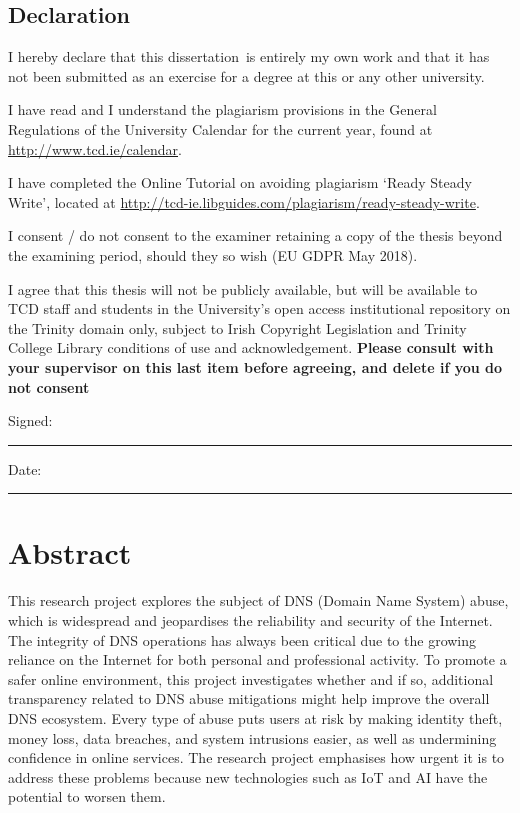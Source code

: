 \documentclass[a4paper,oneside,12pt]{book}
\title{\thesistitle}
\author{\authorname}
\newcommand{\typeofthesis}{dissertation} %
\numberwithin{equation}{chapter} %
\begin{document}

\section*{\Huge\textcolor{tcd_blue}{Declaration}}
\vspace{1cm}
I hereby declare that this \typeofthesis\ is entirely my own work and that it has not been submitted as an exercise for a degree at this or any other university.

\vspace{1cm}
I have read and I understand the plagiarism provisions in the General Regulations of the University Calendar for the current year, found at \url{http://www.tcd.ie/calendar}.
\vspace{1cm}

I have completed the Online Tutorial on avoiding plagiarism `Ready Steady Write', located at \url{http://tcd-ie.libguides.com/plagiarism/ready-steady-write}.
\vspace{1cm}

I consent / do not consent to the examiner retaining a copy of the thesis beyond the examining period, should they so wish (EU GDPR May 2018).
\vspace{1cm}

I agree that this thesis will not be publicly available, but will be available to TCD staff and students in the University’s open access institutional repository on the Trinity domain only, subject to Irish Copyright Legislation and Trinity College Library conditions of use and acknowledgement.  \textbf{Please consult with your supervisor on this last item before agreeing, and delete if you do not consent}
\vspace{3cm}

Signed:~\rule{5cm}{0.3pt}\hfill Date:~\rule{5cm}{0.3pt}



\chapter*{Abstract}

This research project explores the subject of DNS (Domain Name System) abuse, which is widespread and jeopardises the reliability and security of the Internet. The integrity of DNS operations has always been critical due to the growing reliance on the Internet for both personal and professional activity. To promote a safer online environment, this project investigates whether and if so, additional transparency related to DNS abuse mitigations might help improve the overall DNS ecosystem. Every type of abuse puts users at risk by making identity theft, money loss, data breaches, and system intrusions easier, as well as undermining confidence in online services. The research project emphasises how urgent it is to address these problems because new technologies such as IoT and AI have the potential to worsen them.
\end{document}
